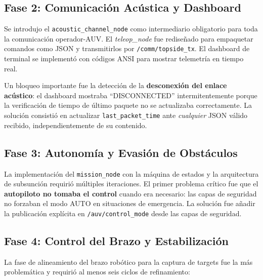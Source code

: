 \documentclass[10pt,twocolumn,letterpaper]{article}
\begin{document}
\subsection{Fase 2: Comunicación Acústica y Dashboard}

Se introdujo el \texttt{acoustic\_channel\_node} como intermediario obligatorio para toda la comunicación operador-AUV. El \textit{teleop\_node} fue rediseñado para empaquetar comandos como JSON y transmitirlos por \texttt{/comm/topside\_tx}. El dashboard de terminal se implementó con códigos ANSI para mostrar telemetría en tiempo real.

Un bloqueo importante fue la detección de la \textbf{desconexión del enlace acústico}: el dashboard mostraba ``DISCONNECTED'' intermitentemente porque la verificación de tiempo de último paquete no se actualizaba correctamente. La solución consistió en actualizar \texttt{last\_packet\_time} ante \textit{cualquier} JSON válido recibido, independientemente de su contenido.

\subsection{Fase 3: Autonomía y Evasión de Obstáculos}

La implementación del \texttt{mission\_node} con la máquina de estados y la arquitectura de subsunción requirió múltiples iteraciones. El primer problema crítico fue que el \textbf{autopiloto no tomaba el control} cuando era necesario: las capas de seguridad no forzaban el modo AUTO en situaciones de emergencia. La solución fue añadir la publicación explícita en \texttt{/auv/control\_mode} desde las capas de seguridad.

\subsection{Fase 4: Control del Brazo y Estabilización}

La fase de alineamiento del brazo robótico para la captura de targets fue la más problemática y requirió al menos seis ciclos de refinamiento:
\end{document}
